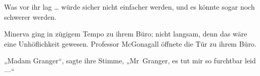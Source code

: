 Was vor ihr lag … würde sicher nicht einfacher werden, und es könnte sogar noch schwerer werden.

\later

Minerva ging in zügigem Tempo zu ihrem Büro; nicht langsam, denn das wäre eine Unhöflichkeit gewesen.
Professor McGonagall öffnete die Tür zu ihrem Büro.

„Madam Granger“, sagte ihre Stimme,
„Mr~Granger, es tut mir so furchtbar leid —“

